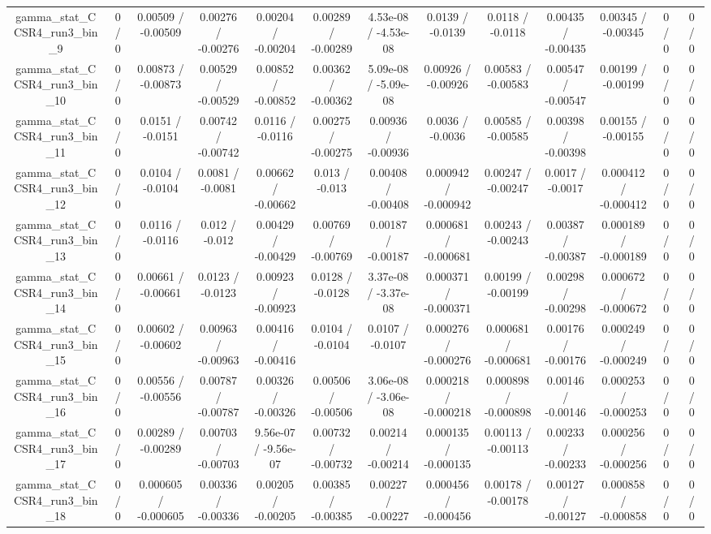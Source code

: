 \documentclass[10pt]{article}
\begin{document}
\begin{table}[htbp]
\begin{center}
\begin{tabular}{|c|c|c|c|c|c|c|c|c|c|c|c|c|}
  gamma_stat_CCSR4_run3_bin_9 & 0 / 0 & 0.00509 / -0.00509 & 0.00276 / -0.00276 & 0.00204 / -0.00204 & 0.00289 / -0.00289 & 4.53e-08 / -4.53e-08 & 0.0139 / -0.0139 & 0.0118 / -0.0118 & 0.00435 / -0.00435 & 0.00345 / -0.00345 & 0 / 0 & 0 / 0 \\ 
  gamma_stat_CCSR4_run3_bin_10 & 0 / 0 & 0.00873 / -0.00873 & 0.00529 / -0.00529 & 0.00852 / -0.00852 & 0.00362 / -0.00362 & 5.09e-08 / -5.09e-08 & 0.00926 / -0.00926 & 0.00583 / -0.00583 & 0.00547 / -0.00547 & 0.00199 / -0.00199 & 0 / 0 & 0 / 0 \\ 
  gamma_stat_CCSR4_run3_bin_11 & 0 / 0 & 0.0151 / -0.0151 & 0.00742 / -0.00742 & 0.0116 / -0.0116 & 0.00275 / -0.00275 & 0.00936 / -0.00936 & 0.0036 / -0.0036 & 0.00585 / -0.00585 & 0.00398 / -0.00398 & 0.00155 / -0.00155 & 0 / 0 & 0 / 0 \\ 
  gamma_stat_CCSR4_run3_bin_12 & 0 / 0 & 0.0104 / -0.0104 & 0.0081 / -0.0081 & 0.00662 / -0.00662 & 0.013 / -0.013 & 0.00408 / -0.00408 & 0.000942 / -0.000942 & 0.00247 / -0.00247 & 0.0017 / -0.0017 & 0.000412 / -0.000412 & 0 / 0 & 0 / 0 \\ 
  gamma_stat_CCSR4_run3_bin_13 & 0 / 0 & 0.0116 / -0.0116 & 0.012 / -0.012 & 0.00429 / -0.00429 & 0.00769 / -0.00769 & 0.00187 / -0.00187 & 0.000681 / -0.000681 & 0.00243 / -0.00243 & 0.00387 / -0.00387 & 0.000189 / -0.000189 & 0 / 0 & 0 / 0 \\ 
  gamma_stat_CCSR4_run3_bin_14 & 0 / 0 & 0.00661 / -0.00661 & 0.0123 / -0.0123 & 0.00923 / -0.00923 & 0.0128 / -0.0128 & 3.37e-08 / -3.37e-08 & 0.000371 / -0.000371 & 0.00199 / -0.00199 & 0.00298 / -0.00298 & 0.000672 / -0.000672 & 0 / 0 & 0 / 0 \\ 
  gamma_stat_CCSR4_run3_bin_15 & 0 / 0 & 0.00602 / -0.00602 & 0.00963 / -0.00963 & 0.00416 / -0.00416 & 0.0104 / -0.0104 & 0.0107 / -0.0107 & 0.000276 / -0.000276 & 0.000681 / -0.000681 & 0.00176 / -0.00176 & 0.000249 / -0.000249 & 0 / 0 & 0 / 0 \\ 
  gamma_stat_CCSR4_run3_bin_16 & 0 / 0 & 0.00556 / -0.00556 & 0.00787 / -0.00787 & 0.00326 / -0.00326 & 0.00506 / -0.00506 & 3.06e-08 / -3.06e-08 & 0.000218 / -0.000218 & 0.000898 / -0.000898 & 0.00146 / -0.00146 & 0.000253 / -0.000253 & 0 / 0 & 0 / 0 \\ 
  gamma_stat_CCSR4_run3_bin_17 & 0 / 0 & 0.00289 / -0.00289 & 0.00703 / -0.00703 & 9.56e-07 / -9.56e-07 & 0.00732 / -0.00732 & 0.00214 / -0.00214 & 0.000135 / -0.000135 & 0.00113 / -0.00113 & 0.00233 / -0.00233 & 0.000256 / -0.000256 & 0 / 0 & 0 / 0 \\ 
  gamma_stat_CCSR4_run3_bin_18 & 0 / 0 & 0.000605 / -0.000605 & 0.00336 / -0.00336 & 0.00205 / -0.00205 & 0.00385 / -0.00385 & 0.00227 / -0.00227 & 0.000456 / -0.000456 & 0.00178 / -0.00178 & 0.00127 / -0.00127 & 0.000858 / -0.000858 & 0 / 0 & 0 / 0 \\ 

\end{tabular}
\end{center}
\end{table}
\end{document}
